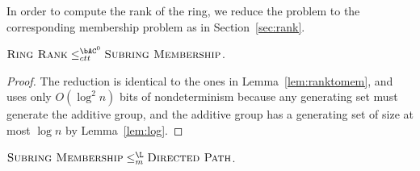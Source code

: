 In order to compute the rank of the ring, we reduce the problem to the corresponding membership problem as in Section~\ref{sec:rank}.

\begin{lemma}\label{lem:ringranktomem}
  $\textsc{Ring Rank} \leq_{ctt}^{\bAC^0} \textsc{Subring Membership}$.
\end{lemma}
\begin{proof}
  The reduction is identical to the ones in Lemma~\ref{lem:ranktomem}, and uses only $O(\log^2 n)$ bits of nondeterminism because any generating set must generate the additive group, and the additive group has a generating set of size at most $\log n$ by Lemma~\ref{lem:log}.
\end{proof}

\begin{lemma}\label{lem:memtopath}
  $\textsc{Subring Membership} \leq_m^{\L} \textsc{Directed Path}$.
\end{lemma}
